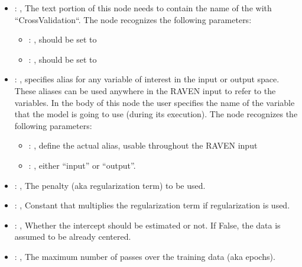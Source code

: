 \begin{itemize}
    \item {}: , 
      The text portion of this node needs to contain the name of the  with
               ``CrossValidation``.
      The  node recognizes the following parameters:
        \begin{itemize}
          \item {}: , 
            should be set to 
          \item {}: , 
            should be set to 
      \end{itemize}

    \item {}: , 
      specifies alias for         any variable of interest in the input or output space. These
      aliases can be used anywhere in the RAVEN input to         refer to the variables. In the body
      of this node the user specifies the name of the variable that the model is going to use
      (during its execution).
      The  node recognizes the following parameters:
        \begin{itemize}
          \item {}: , 
            define the actual alias, usable throughout the RAVEN input
          \item {}: , 
            either ``input'' or ``output''.
      \end{itemize}

    \item {}: \xmlDesc{[l2,  l1, elasticnet]}, 
      The penalty (aka regularization term) to be used.

    \item {}: , 
      Constant that multiplies the regularization term if regularization is used.

    \item {}: , 
      Whether the intercept should be estimated or not. If False,
      the data is assumed to be already centered.

    \item {}: , 
      The maximum number of passes over the training data (aka epochs).


\end{itemize}
